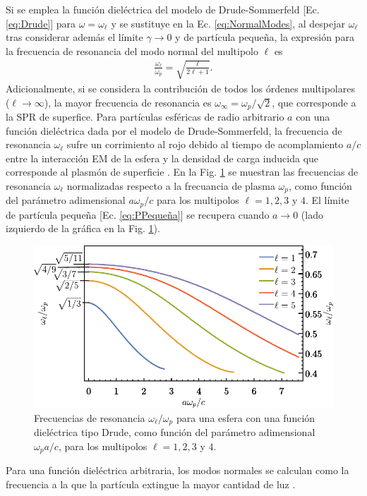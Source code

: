Si se emplea la función dieléctrica del modelo de Drude-Sommerfeld [Ec.  \eqref{eq:Drude}] para $\omega = \omega_\ell$	y se sustituye en la Ec.  \eqref{eq:NormalModes}, al despejar $\omega_\ell$ tras considerar además el límite $\gamma\to 0$ y de partícula pequeña, la expresión para la frecuencia de resonancia del  modo normal del multipolo $\ell$ es \cite{maciel2017momentum}
	\begin{align}
	\frac{\omega_\ell}{\omega_p} = \sqrt{ \frac{\ell}{2\ell+1}}. \label{eq:PPequeña}
	\end{align}
Adicionalmente, si se considera la contribución de todos los órdenes multipolares ($\ell\to \infty$), la mayor frecuencia de resonancia es $\omega_\infty = \omega_p/\sqrt{2}$, que corresponde a la SPR de superfice.	Para partículas esféricas de radio arbitrario $a$ con una función dieléctrica dada por el modelo de Drude-Sommerfeld, la frecuencia de resonancia $\omega_\ell$ sufre un corrimiento al rojo debido al tiempo de acomplamiento $a/c$ entre la interacción EM de la esfera y  la densidad de carga inducida que corresponde al plasmón de superficie \cite{aizpurua1998coupling}.  En la Fig.  \ref{fig:NormalModes} se muestran las frecuencias de resonancia $\omega_\ell$ normalizadas respecto a la frecuancia de plasma $\omega_p$, como función del parámetro adimensional $a\omega_p / c$ para los multipolos $\ell = 1,2,3$ y $4$.  El límite de partícula pequeña [Ec.  \eqref{eq:PPequeña}]	se recupera cuando  $a\to 0$ (lado izquierdo de la gráfica en la Fig.  \ref{fig:NormalModes}).  

	\begin{figure}[h!]\centering
		\includegraphics[scale=1]{1-Teoria/figs/1-4-DrudeMultipoles.pdf}\vspace*{-1em}
	\caption{Frecuencias de resonancia $\omega_\ell/\omega_p$ para una esfera con una función dieléctrica tipo Drude, como función del parámetro adimensional  $\omega_p a / c$, para los multipolos $\ell = 1,2,3$ y $4$. }
	\label{fig:NormalModes}
	\end{figure}		


Para una función dieléctrica arbitraria, los modos normales se calculan como la frecuencia a la que la partícula extingue la mayor cantidad de luz \cite{kreibig1995clusters}. 
